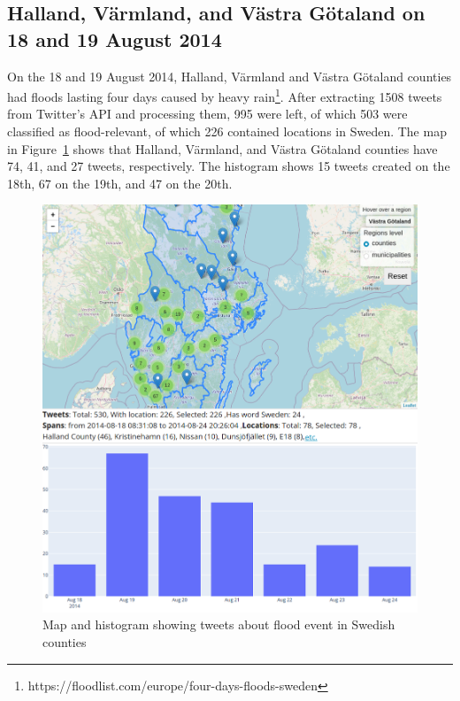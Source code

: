 \subsection{Halland, Värmland, and Västra Götaland on 18 and 19 August 2014}

On the 18 and 19 August 2014, Halland, Värmland and Västra Götaland counties had floods lasting four
days caused by heavy rain\footnote{https://floodlist.com/europe/four-days-floods-sweden}. After
extracting 1508 tweets from Twitter's \ac{API} and processing them, 995 were left, of which 503 were
classified as flood-relevant, of which 226 contained locations in Sweden. The map in
Figure~\ref{fig:4days_floods} shows that Halland, Värmland, and Västra Götaland counties have 74,
41, and 27 tweets, respectively. The histogram shows 15 tweets created on the 18th, 67 on the 19th,
and 47 on the 20th.

\begin{figure}[H]
  \begin{center}
    \includegraphics[width=13cm]{./images/4days_floods.png}
  \end{center}
  \caption{Map and histogram showing tweets about flood event in Swedish counties}
  \label{fig:4days_floods}
\end{figure}

